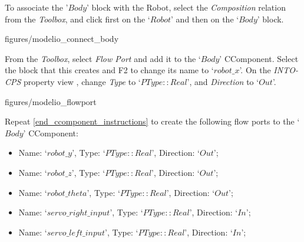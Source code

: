 \documentclass[11pt,a4paper]{../tutorial}
\begin{document}
\begin{instructions}
\item \label{composition_instructions}To associate the '$Body$' block with the Robot, select the \emph{Composition} relation from the \emph{Toolbox}, and click first on the `$Robot$' and then on the `$Body$' block.

\begin{center}
\begin{annotation}[width=0.7\linewidth]{figures/modelio_connect_body}
    \end{annotation}
\end{center}

\item \label{end_ccomponent_instructions} From the \emph{Toolbox}, select \emph{Flow Port} and add it to the `$Body$' CComponent. Select the block that this creates and F2 to change its name to `$robot\_x$'. On the  \emph{INTO-CPS} property view , change \emph{Type} to `$PType::Real$', and \emph{Direction} to `$Out$'.

\begin{center}
\begin{annotation}[width=0.7\linewidth]{figures/modelio_flowport}
    \end{annotation}
\end{center}

\item Repeat \ref{end_ccomponent_instructions}  to create the following flow ports to the `$Body$' CComponent:
\begin{itemize}
	\item Name: `$robot\_y$', Type: `$PType::Real$', Direction:  `$Out$';
	\item Name: `$robot\_z$', Type: `$PType::Real$', Direction:  `$Out$';
	\item Name: `$robot\_theta$', Type: `$PType::Real$', Direction:  `$Out$';
	\item Name: `$servo\_right\_input$', Type: `$PType::Real$', Direction:  `$In$';
	\item Name: `$servo\_left\_input$', Type: `$PType::Real$', Direction:  `$In$';
\end{itemize}


\end{instructions}
\end{document}

